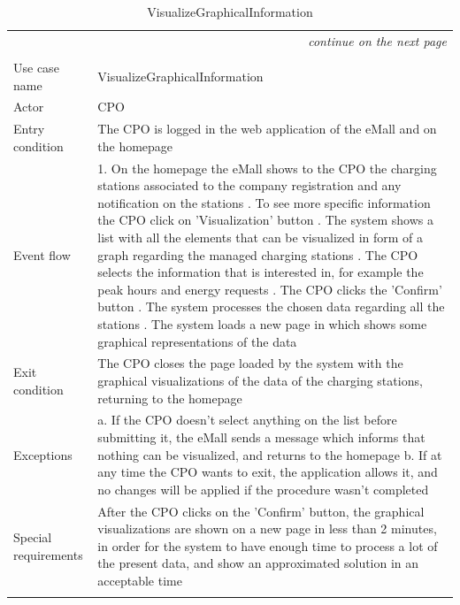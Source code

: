 \begin{center}
    \begin{longtable}{p{4cm} p{11cm}}
    \multicolumn{2}{r}{\itshape{continue on the next page}}\\
    \endfoot 
    \\
    \endlastfoot
    \hline
     Use case name &  VisualizeGraphicalInformation\\
     \hline
     Actor & CPO \\
     \hline
     Entry condition & The CPO is logged in the web application of the eMall and on the homepage \\
     \hline
     Event flow &   1. On the homepage the eMall shows to the CPO the charging stations associated to the company                   registration and any notification on the stations \newline
                    2. To see more specific information the CPO click on 'Visualization' button \newline 
                    3. The system shows a list with all the elements that can be visualized in form of a graph regarding the managed charging stations \newline
                    4. The CPO selects the information that is interested in, for example the peak hours and energy requests \newline
                    5. The CPO clicks the 'Confirm' button \newline
                    6. The system processes the chosen data regarding all the stations \newline
                    7. The system loads a new page in which shows some graphical representations of the data \\
     \hline
     Exit condition &  The CPO closes the page loaded by the system with the graphical visualizations of the data of the charging stations, returning to the homepage \\
     \hline
     Exceptions &   a. If the CPO doesn't select anything on the list before submitting it, the eMall sends a                       message which informs that nothing can be visualized, and returns to the homepage \newline
                    b. If at any time the CPO wants to exit, the application allows it, and no changes will be applied if the procedure wasn't completed \\
     \hline
     Special requirements & After the CPO clicks on the 'Confirm' button, the graphical visualizations are shown on a new page in less than 2 minutes, in order for the system to have enough time to process a lot of the present data, and show an approximated solution in an acceptable time \\
     \hline
    \caption{VisualizeGraphicalInformation}
    \label{tab:VisualizeGraphicalInformation}
    \end{longtable}
\end{center}

